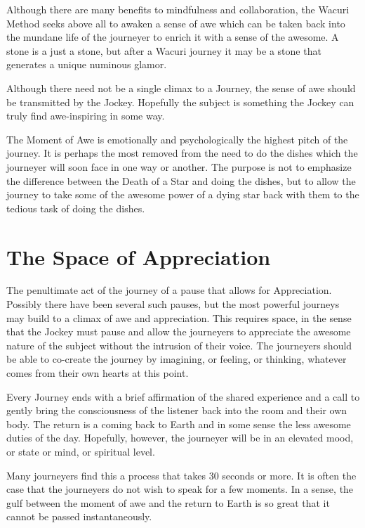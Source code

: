 \documentclass[12pt]{book}
\begin{document}
Although there are many benefits to mindfulness and collaboration, the Wacuri Method seeks above all to awaken a sense of awe which can be taken back into the mundane life of the journeyer to enrich it with a sense of the awesome. A stone is a just a stone, but after a Wacuri journey it may be a stone that generates a unique numinous glamor.
					
Although there need not be a single climax to a Journey, the sense of awe should be transmitted by the Jockey. Hopefully the subject is something the Jockey can truly find awe-inspiring in some way.
					
The Moment of Awe is emotionally and psychologically the highest pitch of the journey. It is perhaps the most removed from the need to do the dishes which the journeyer will soon face in one way or another. The purpose is not to emphasize the difference between the Death of a Star and doing the dishes, but to allow the journey to take some of the awesome power of a dying star back with them to the tedious task of doing the dishes.
					
\section{The Space of Appreciation}
					
The penultimate act of the journey of a pause that allows for Appreciation. Possibly there have been several such pauses, but the most powerful journeys may build to a climax of awe and appreciation. This requires space, in the sense that the Jockey must pause and allow the journeyers to appreciate the awesome nature of the subject without the intrusion of their voice. The journeyers should be able to co-create the journey by imagining, or feeling, or thinking, whatever comes from their own hearts at this point.
				
					
Every Journey ends with a brief affirmation of the shared experience and a call to gently bring the consciousness of the listener back into the room and their own body. The return is a coming back to Earth and in some sense the less awesome duties of the day. Hopefully, however, the journeyer will be in an elevated mood, or state or mind, or spiritual level.
					
Many journeyers find this a process that takes 30 seconds or more. It is often the case that the journeyers do not wish to speak for a few moments. In a sense, the gulf between the moment of awe and the return to Earth is so great that it cannot be passed instantaneously.
					
\end{document}
